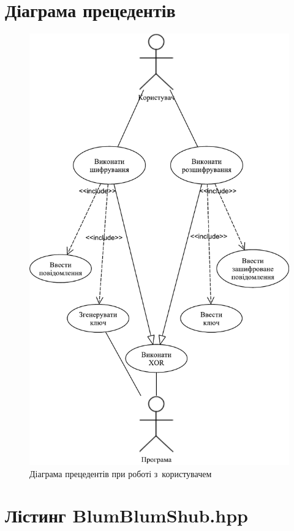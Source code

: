 \documentclass[a4paper,oneside,titlepage,14pt]{extarticle}
\begin{document}
\begin{appendices}
		\section{Діаграма прецедентів}
			\vspace*{\fill}
			\begin{figure}[h]
				\centering
				\includegraphics[scale=0.65]{diagrams/use-case-diag.pdf}
				\caption{Діаграма прецедентів при роботі з~користувачем}
				\label{fig:usecasediag}
			\end{figure}
			\vspace*{\fill}
		\section{Лістинг BlumBlumShub.hpp}
			\inputminted[tabsize=4,breaklines,breakbytokenanywhere,breaksymbol={},style=bw]{cpp}{source-codes/BlumBlumShub.hpp}
		\newpage

\end{appendices}
\end{document}
